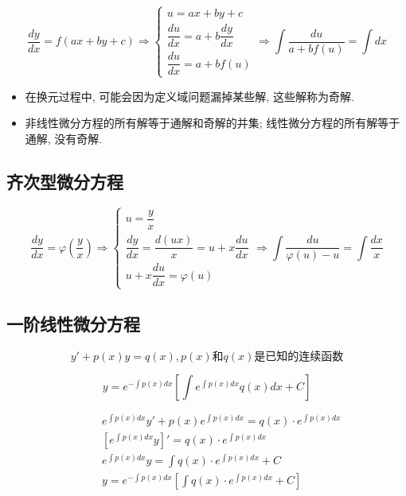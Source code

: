 $$\dfrac{dy}{dx} = f(ax+by+c)\Rightarrow 
\begin{cases}
	u = ax +by +c\\
	\dfrac{du}{dx} = a + b\dfrac{dy}{dx}\\
	\dfrac{du}{dx} = a + bf(u)
\end{cases}\Rightarrow \int \dfrac{du}{a + bf(u)} = \int dx$$
\begin{anymark}[注]
	\begin{itemize}
		\item 在换元过程中, 可能会因为定义域问题漏掉某些解, 这些解称为奇解.
		\item 非线性微分方程的所有解等于通解和奇解的并集; 线性微分方程的所有解等于通解, 没有奇解.
	\end{itemize}
\end{anymark}

\subsection{齐次型微分方程}
$$\dfrac{dy}{dx} = \varphi(\dfrac{y}{x})\Rightarrow 
\begin{cases}
	u = \dfrac{y}{x}\\
	\dfrac{dy}{dx} = \dfrac{d(ux)}{x} = u + x\dfrac{du}{dx}\\
	u + x\dfrac{du}{dx} = \varphi(u)
\end{cases}\Rightarrow \int \dfrac{du}{\varphi(u) - u} =\int \dfrac{dx}{x} $$

\subsection{一阶线性微分方程}\label{def: 一阶线性微分方程公式}
\begin{definition}[一阶线性微分方程]
	$$y'+p(x)y=q(x), p(x)\text{和} q(x)\text{是已知的连续函数}$$
\end{definition}
\begin{theorem}[一阶线性微分方程解]
	$$y=e^{-\int p(x)dx}\left[\int e^{\int p(x)dx}q(x)dx+C\right]$$
	\begin{anymark}[注]
		\begin{eqnarray*}
			&\quad & e^{\int p(x)dx}y' + p(x)e^{\int p(x)dx} = q(x)\cdot e^{\int p(x)dx}\\
			&\quad & \left[e^{\int p(x)dx}y\right]' = q(x)\cdot e^{\int p(x)dx}\\
			&\quad & e^{\int p(x)dx}y = \int q(x)\cdot e^{\int p(x)dx} + C\\
			&\quad & y = e^{-\int p(x)dx}\left[\int q(x)\cdot e^{\int p(x)dx} + C\right]
		\end{eqnarray*}
	\end{anymark}
\end{theorem}


